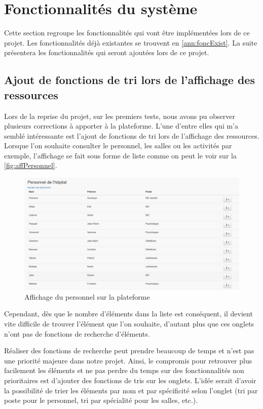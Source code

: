 \documentclass{polytech/polytech}
\begin{document}
\section{Fonctionnalités du système}

Cette section regroupe les fonctionnalités qui vont être implémentées lors de ce projet. Les fonctionnalités déjà existantes se trouvent en \autoref{ann:foncExist}. La suite présentera les fonctionnalités qui seront ajoutées lors de ce projet. 


\subsection{Ajout de fonctions de tri lors de l'affichage des ressources}

Lors de la reprise du projet, sur les premiers tests, nous avons pu observer plusieurs corrections à apporter à la plateforme. L'une d'entre elles qui m'a semblé intéressante est l'ajout de fonctions de tri lors de l'affichage des ressources. Lorsque l'on souhaite consulter le personnel, les salles ou les activités par exemple, l'affichage se fait sous forme de liste comme on peut le voir sur la \autoref{fig:affPersonnel}.

\begin{figure}
	\includegraphics[scale=0.45]{images/affichage_personnel}
	\caption{Affichage du personnel sur la plateforme}
	\label{fig:affPersonnel}
\end{figure}

Cependant, dès que le nombre d'éléments dans la liste est conséquent, il devient vite difficile de trouver l'élément que l'on souhaite, d'autant plus que ces onglets n'ont pas de fonctions de recherche d'éléments.

Réaliser des fonctions de recherche peut prendre beaucoup de temps et n'est pas une priorité majeure dans notre projet. Ainsi, le compromis pour retrouver plus facilement les éléments et ne pas perdre du temps sur des fonctionnalités non prioritaires est d'ajouter des fonctions de tris sur les onglets. L'idée serait d'avoir la possibilité de trier les éléments par nom et par spécificité selon l'onglet (tri par poste pour le personnel, tri par spécialité pour les salles, etc.).
\end{document}
